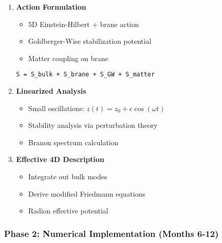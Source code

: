 \documentclass[
  11pt,
]{report}
\providecommand{\tightlist}{%
  \setlength{\itemsep}{0pt}\setlength{\parskip}{0pt}}
\begin{document}
\begin{enumerate}
\def\labelenumi{\arabic{enumi}.}
\tightlist
\item
  \textbf{Action Formulation}

  \begin{itemize}
  \tightlist
  \item
    5D Einstein-Hilbert + brane action
  \item
    Goldberger-Wise stabilization potential
  \item
    Matter coupling on brane
  \end{itemize}

\begin{verbatim}
S = S_bulk + S_brane + S_GW + S_matter
\end{verbatim}
\item
  \textbf{Linearized Analysis}

  \begin{itemize}
  \tightlist
  \item
    Small oscillations: \(z(t) = z_0 + \epsilon \cos(\omega t)\)
  \item
    Stability analysis via perturbation theory
  \item
    Branon spectrum calculation
  \end{itemize}
\item
  \textbf{Effective 4D Description}

  \begin{itemize}
  \tightlist
  \item
    Integrate out bulk modes
  \item
    Derive modified Friedmann equations
  \item
    Radion effective potential
  \end{itemize}
\end{enumerate}

\subsubsection{Phase 2: Numerical Implementation (Months
6-12)}\label{phase-2-numerical-implementation-months-6-12}
\end{document}
